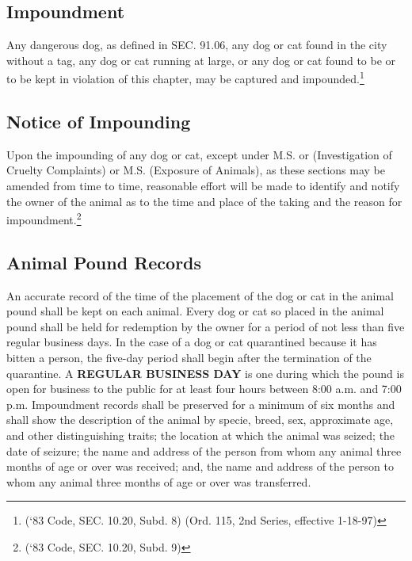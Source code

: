 \subsection{Impoundment}
Any dangerous dog, as defined in SEC. 91.06, any dog or cat found in the city without a tag, any dog or cat running at large, or any dog or cat found to be or to be kept in violation of this chapter, may be captured and impounded.\footnote{(‘83 Code, SEC. 10.20, Subd. 8)  (Ord. 115, 2nd Series, effective 1-18-97)}
\subsection{Notice of Impounding}
Upon the impounding of any dog or cat, except under M.S.  or  (Investigation of Cruelty Complaints) or M.S.  (Exposure of Animals), as these sections may be amended from time to time, reasonable effort will be made to identify and notify the owner of the animal as to the time and place of the taking and the reason for impoundment.\footnote{(‘83 Code, SEC. 10.20, Subd. 9)}
\subsection{Animal Pound Records}
An accurate record of the time of the placement of the dog or cat in the animal pound shall be kept on each animal. Every dog or cat so placed in the animal pound shall be held for redemption by the owner for a period of not less than five regular business days. In the case of a dog or cat quarantined because it has bitten a person, the five-day period shall begin after the termination of the quarantine. A \textbf{REGULAR BUSINESS DAY} is one during which the pound is open for business to the public for at least four hours between 8:00 a.m. and 7:00 p.m. Impoundment records shall be preserved for a minimum of six months and shall show the description of the animal by specie, breed, sex, approximate age, and other distinguishing traits; the location at which the animal was seized; the date of seizure; the name and address of the person from whom any animal three months of age or over was received; and, the name and address of the person to whom any animal three months of age or over was transferred.
